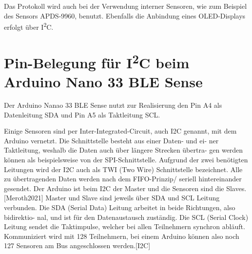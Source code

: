 Das Protokoll wird auch bei der Verwendung  interner Sensoren, wie zum Beispiel des Sensors APDS-9960, benutzt. Ebenfalls die Anbindung eines OLED-Displays erfolgt über I\textsuperscript{2}C.


\section{Pin-Belegung für I\textsuperscript{2}C beim Arduino Nano 33 BLE Sense}

Der Arduino Nanao 33 BLE Sense nutzt zur Realisierung den Pin A4 als Datenleitung SDA und Pin A5 als Taktleitung SCL. 


Einige Sensoren sind per Inter-Integrated-Circuit, auch I2C genannt, mit
dem Arduino vernetzt. Die Schnittstelle besteht aus einer Daten- und ei-
ner Taktleitung, weshalb die Daten auch über längere Strecken übertra-
gen werden können als beispielsweise von der SPI-Schnittstelle. Aufgrund
der zwei benötigten Leitungen wird der I2C auch als TWI (Two Wire)
Schnittstelle bezeichnet. Alle zu übertragenden Daten werden nach dem
FIFO-Prinzip/ seriell hintereinander gesendet. Der Arduino ist beim I2C
der Master und die Sensoren sind die Slaves.[Meroth2021]
Master und Slave sind jeweils über SDA und SCL Leitung verbunden. Die
SDA (Serial Data) Leitung arbeitet in beide Richtungen, also bidirektio-
nal, und ist für den Datenaustausch zuständig. Die SCL (Serial Clock)
Leitung sendet die Taktimpulse, welcher bei allen Teilnehmern synchron
abläuft. Kommuniziert wird mit 128 Teilnehmern, bei einem Arduino
können also noch 127 Sensoren am Bus angeschlossen werden.[I2C]

\begin{figure}[!ht]
    \centering
\end{figure}



